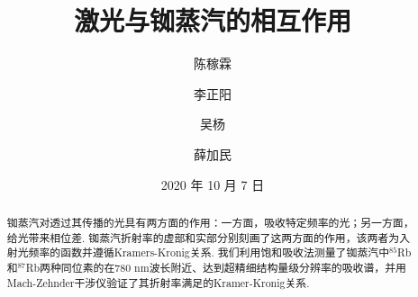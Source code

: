\documentclass[a4paper,10pt]{article}
\begin{document}
\title{激光与铷蒸汽的相互作用}
\author{陈稼霖\and 李正阳\and 吴杨\and 薛加民}
\date{2020 年 10 月 7 日}
\maketitle
\begin{abstract}
    铷蒸汽对透过其传播的光具有两方面的作用：一方面，吸收特定频率的光；另一方面，给光带来相位差. 铷蒸汽折射率的虚部和实部分别刻画了这两方面的作用，该两者为入射光频率的函数并遵循Kramers-Kronig关系. 我们利用饱和吸收法测量了铷蒸汽中$^{85}$Rb和$^{87}$Rb两种同位素的在$780$ nm波长附近、达到超精细结构量级分辨率的吸收谱，并用Mach-Zehnder干涉仪验证了其折射率满足的Kramer-Kronig关系.
\end{abstract}
\end{document}
